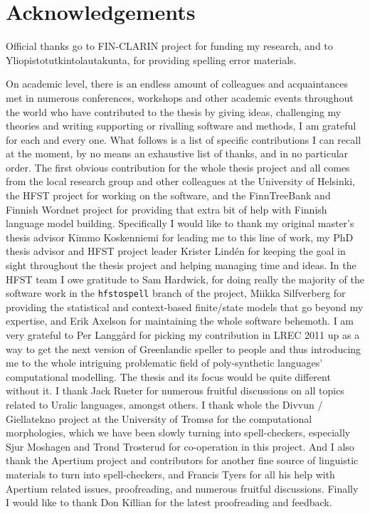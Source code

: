 \documentclass[officiallayout]{unihelcompling}
\begin{document}
\section*{Acknowledgements}
\label{sec:acknowledgements}

Official thanks go to FIN-CLARIN project for funding my research, and to
Yliopistotutkintolautakunta, for providing spelling error materials.

On academic level, there is an endless amount of colleagues and acquaintances
met in numerous conferences, workshops and other academic events throughout the
world who have contributed to the thesis by giving ideas, challenging my
theories and writing supporting or rivalling software and methods, I am
grateful for each and every one. What follows is a list of specific
contributions I can recall at the moment, by no means an exhaustive list of
thanks, and in no particular order.  The first obvious contribution for the
whole thesis project and all comes from the local research group and other
colleagues at the University of Helsinki, the HFST project for working on the
software, and the FinnTreeBank and Finnish Wordnet project for providing that
extra bit of help with Finnish language model building. Specifically I would
like to thank my original master's thesis advisor Kimmo Koskenniemi for leading
me to this line of work, my PhD thesis advisor and HFST project leader Krister
Lindén for keeping the goal in sight throughout the thesis project and helping
managing time and ideas.  In the HFST team I owe gratitude to Sam Hardwick, for
doing really the majority of the software work in the \texttt{hfstospell}
branch of the project, Miikka Silfverberg for providing the statistical and
context-based finite\-/state models that go beyond my expertise, and Erik
Axelson for maintaining the whole software behemoth.  I am very grateful to Per
Langgård for picking my contribution in LREC 2011 up as a way to get the next
version of Greenlandic speller to people and thus introducing me to the whole
intriguing problematic field of poly-synthetic languages' computational
modelling. The thesis and its focus would be quite different without it.  I
thank Jack Rueter for numerous fruitful discussions on all topics related to
Uralic languages, amongst others.  I thank whole the Divvun / Giellatekno
project at the University of Tromsø for the computational morphologies, which
we have been slowly turning into spell-checkers, especially Sjur Moshagen and
Trond Trosterud for co-operation in this project. And I also thank the Apertium
project and contributors for another fine source of linguistic materials to
turn into spell-checkers, and Francis Tyers for all his help with Apertium
related issues, proofreading, and numerous fruitful discussions. Finally I
would like to thank Don Killian for the latest proofreading and feedback.
\end{document}
